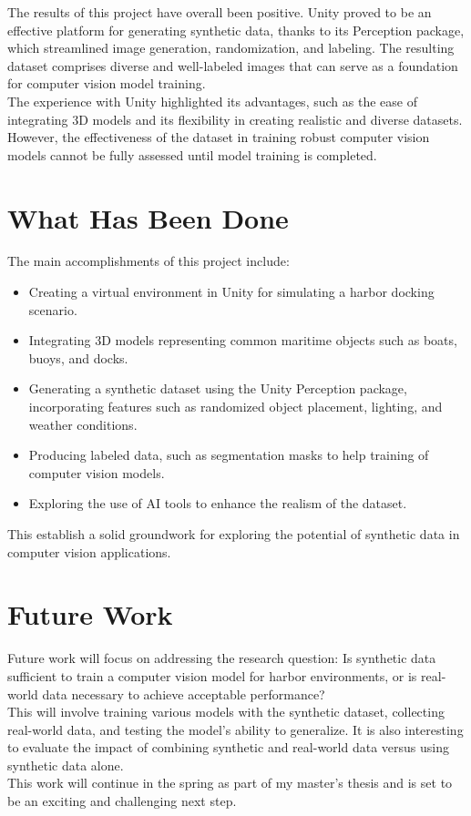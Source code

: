 
The results of this project have overall been positive. Unity proved to be an effective platform for generating synthetic data, thanks to its Perception package, which streamlined image generation, randomization, and labeling. The resulting dataset comprises diverse and well-labeled images that can serve as a foundation for computer vision model training.\\

\noindent The experience with Unity highlighted its advantages, such as the ease of integrating 3D models and its flexibility in creating realistic and diverse datasets. However, the effectiveness of the dataset in training robust computer vision models cannot be fully assessed until model training is completed.


\section{What Has Been Done}
The main accomplishments of this project include: 
\begin{itemize} 
\item Creating a virtual environment in Unity for simulating a harbor docking scenario. 
\item Integrating 3D models representing common maritime objects such as boats, buoys, and docks. 
\item Generating a synthetic dataset using the Unity Perception package, incorporating features such as randomized object placement, lighting, and weather conditions. 
\item Producing labeled data, such as segmentation masks to help training of computer vision models. 
\item Exploring the use of AI tools to enhance the realism of the dataset. 
\end{itemize}
  
\noindent This establish a solid groundwork for exploring the potential of synthetic data in computer vision applications.

\section{Future Work}
Future work will focus on addressing the research question: Is synthetic data sufficient to train a computer vision model for harbor environments, or is real-world data necessary to achieve acceptable performance?\\

\noindent This will involve training various models with the synthetic dataset, collecting real-world data, and testing the model's ability to generalize. It is also interesting to evaluate the impact of combining synthetic and real-world data versus using synthetic data alone.\\

\noindent This work will continue in the spring as part of my master's thesis and is set to be an exciting and challenging next step.
